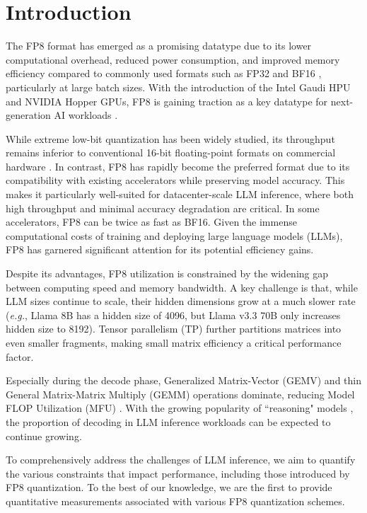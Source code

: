 \section{Introduction}\label{sec:intro}

The FP8 format has emerged as a promising datatype due to its lower computational overhead, reduced power consumption, and improved memory efficiency compared to commonly used formats such as FP32 and BF16 \citep{kalamkar2019studybfloat16deeplearning}, particularly at large batch sizes. With the introduction of the Intel Gaudi HPU and NVIDIA Hopper GPUs, FP8 is gaining traction as a key datatype for next-generation AI workloads \citep{deepseekai2024deepseekv3technicalreport}.

While extreme low-bit quantization has been widely studied, its throughput remains inferior to conventional 16-bit floating-point formats on commercial hardware \citep{lin2024qserve}. In contrast, FP8 has rapidly become the preferred format due to its compatibility with existing accelerators while preserving model accuracy. This makes it particularly well-suited for datacenter-scale LLM inference, where both high throughput and minimal accuracy degradation are critical. In some accelerators, FP8 can be twice as fast as BF16. Given the immense computational costs of training and deploying large language models (LLMs), FP8 has garnered significant attention for its potential efficiency gains.

Despite its advantages, FP8 utilization is constrained by the widening gap between computing speed and memory bandwidth. A key challenge is that, while LLM sizes continue to scale, their hidden dimensions grow at a much slower rate (\textit{e.g.}, Llama 8B has a hidden size of 4096, but Llama v3.3 70B only increases hidden size to 8192). Tensor parallelism (TP) further partitions matrices into even smaller fragments, making small matrix efficiency a critical performance factor. 

Especially during the decode phase, Generalized Matrix-Vector (GEMV) and thin General Matrix-Matrix Multiply (GEMM) operations dominate, reducing Model FLOP Utilization (MFU) \citep{palm, megatron_lm}. With the growing popularity of ``reasoning" models \citep{deepseekai2025deepseekr1incentivizingreasoningcapability}, the proportion of decoding in LLM inference workloads can be expected to continue growing.

To comprehensively address the challenges of LLM inference, we aim to quantify the various constraints that impact performance, including those introduced by FP8 quantization. 
To the best of our knowledge, we are the first to provide quantitative measurements associated with various FP8 quantization schemes. 

